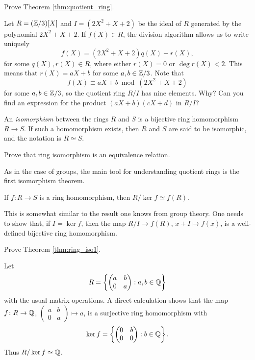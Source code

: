 \begin{exercise}
\label{xca:quotient_ring}
    Prove Theorem \ref{thm:quotient_ring}.
\end{exercise}

\begin{example}
	Let $R=(\mathbb{Z}/3)[X]$ and $I=(2X^2+X+2)$ be the ideal of $R$ 
	generated by the polynomial $2X^2+X+2$. 	If $f(X)\in R$, 
	the division algorithm allows us to write uniquely 
	\[
	f(X)=(2X^2+X+2)q(X)+r(X),
	\]
	for some $q(X),r(X)\in R$, where either $r(X)=0$ or $\deg r(X)<2$. 
	This means
	that $r(X)=aX+b$ for some $a,b\in\mathbb{Z}/3$.
	Note that
	\[
    f(X)\equiv aX+b\bmod (2X^2+X+2)
    \]
	for some $a,b\in\mathbb{Z}/3$, 
	so the quotient ring $R/I$ has 
	nine elements. Why? Can you find an expression for the product 
	$(aX+b)(cX+d)$ in $R/I$?
\end{example}

An \emph{isomorphism} between the rings $R$ and $S$ is a bijective ring
homomorphism $R\to S$. If such a homomorphism exists, then $R$ and $S$ are said
to be isomorphic, and the notation is $R\simeq S$. 

\begin{exercise}
\label{xca:iso}
    Prove that ring isomorphism is an equivalence relation.
\end{exercise}

As in the case of groups, the main tool 
for understanding quotient rings is 
the first isomorphism theorem. 

\begin{theorem}
\label{thm:ring_iso1}
	If $f\colon R\to S$ is a ring homomorphism, then $R/\ker f\simeq f(R)$.  	
\end{theorem}

This is somewhat similar to the result one knows from group theory. 
One needs to show that, if $I=\ker f$, then 
the map $R/I\to f(R)$, $x+I\mapsto f(x)$, is a well-defined 
bijective ring homomorphism. 

\begin{exercise}
\label{xca:first_iso}
    Prove Theorem \ref{thm:ring_iso1}.
\end{exercise}

\begin{example}
Let 
\[
R=\left\{\begin{pmatrix}
a&b\\
0&a
\end{pmatrix}:a,b\in\mathbb{Q}\right\}
\]
with the usual matrix operations. 
A direct calculation shows that the map $f\colon R\to\mathbb{Q}$,
$\begin{pmatrix}a&b\\0&a\end{pmatrix}\mapsto a$, is a surjective ring
homomorphism with  
\[
\ker f=\left\{\begin{pmatrix}
0&b\\
0&0\end{pmatrix}:b\in\mathbb{Q}\right\}.
\]
Thus $R/\ker f\simeq\mathbb{Q}$. 	
\end{example}

